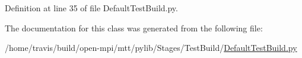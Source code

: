 Definition at line 35 of file Default\-Test\-Build.\-py.



The documentation for this class was generated from the following file\-:\begin{DoxyCompactItemize}
\item 
/home/travis/build/open-\/mpi/mtt/pylib/\-Stages/\-Test\-Build/\hyperlink{_default_test_build_8py}{Default\-Test\-Build.\-py}\end{DoxyCompactItemize}
